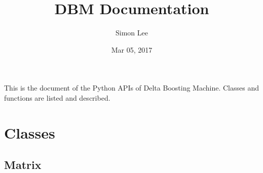 \documentclass[letterpaper,10pt,english]{sphinxmanual}
\title{DBM Documentation}
\date{Mar 05, 2017}
\author{Simon Lee}
\begin{document}
\maketitle
\sphinxtableofcontents
{}\label{\detokenize{index::doc}}


This is the document of the Python APIs of Delta Boosting Machine. Classes and functions are listed and described.


\chapter{Classes}
\label{\detokenize{index:welcome-to-dbm-s-documentation}}\label{\detokenize{index:classes}}

\section{Matrix}
\label{\detokenize{index:matrix}}
\end{document}
